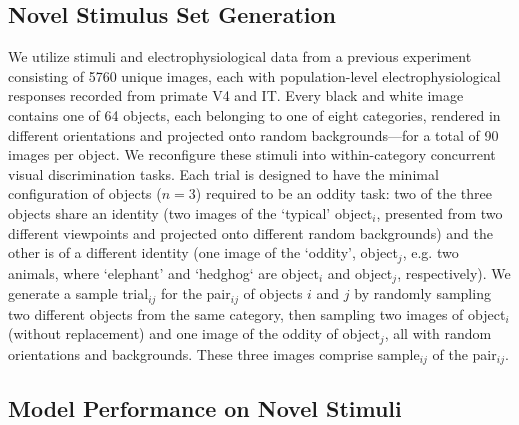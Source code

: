 \documentclass[11pt]{article}
\begin{document}
\subsection{Novel Stimulus Set Generation}

We utilize stimuli and electrophysiological data from a previous experiment\cite{majaj2015simple} consisting of 5760 unique images, each with population-level electrophysiological responses recorded from primate V4 and IT. Every black and white image contains one of 64 objects, each belonging to one of eight categories, rendered in different orientations and projected onto random backgrounds---for a total of 90 images per object. We reconfigure these stimuli into within-category concurrent visual discrimination tasks. Each trial is designed to have the minimal configuration of objects ($n=3$) required to be an oddity task: two of the three objects share an identity (two images of the `typical' object$_{i}$, presented from two different viewpoints and projected onto different random backgrounds) and the other is of a different identity (one image of the `oddity', object$_{j}$, e.g. two animals, where `elephant' and `hedghog` are object$_{i}$ and object$_{j}$, respectively). We generate a sample trial$_{ij}$ for the pair$_{ij}$ of objects $i$ and $j$ by randomly sampling two different objects from the same category, then sampling two images of object$_{i}$ (without replacement) and one image of the oddity of object$_{j}$, all with random orientations and backgrounds. These three images comprise sample$_{ij}$ of the pair$_{ij}$. 

\subsection{Model Performance on Novel Stimuli}
\end{document}
